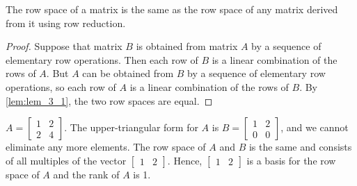 \documentclass[../main.tex]{subfiles}
\begin{document}
\begin{theorem}
	\label{theo:theo_3_3}
	The row space of a matrix is the same as the row space of any matrix derived from it using row reduction.
\end{theorem}

\begin{proof}
	Suppose that matrix $B$ is obtained from matrix $A$ by a sequence of elementary row operations. Then each row of $B$ is a linear combination of the rows of $A$. But $A$ can be obtained from $B$ by a sequence of elementary row operations, so each row of $A$ is a linear combination of the rows of $B$. By \autoref{lem:lem_3_1}, the two row spaces are equal.
\end{proof}

\begin{example}  $A=\left[\begin{array}{ll}1 & 2 \\ 2 & 4\end{array}\right]$. The upper-triangular form for $A$ is $B=\left[\begin{array}{cc}1 & 2 \\ 0 & 0\end{array}\right]$, and we cannot eliminate any more elements. The row space of $A$ and $B$ is the same and consists of all multiples of the vector
$\left[\begin{array}{cc} 1 & 2\end{array}\right].$
Hence,
 $\left[\begin{array}{cc} 1 & 2\end{array}\right]$
 is a basis for the row space of $A$ and the rank of $A$ is 1.


\end{example}
\end{document}
